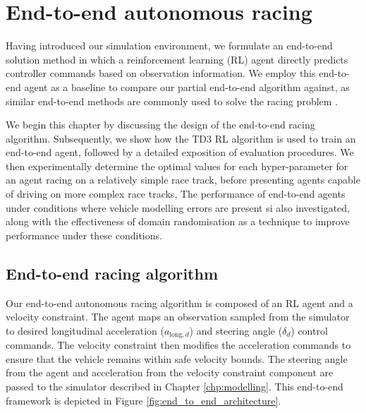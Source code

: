 \chapter{End-to-end autonomous racing}\label{chp:end_to_end_autonomous_racing}

Having introduced our simulation environment, 
we formulate an end-to-end solution method in which a reinforcement learning (RL) agent directly predicts controller commands based on observation information. 
We employ this end-to-end agent as a baseline to compare our partial end-to-end algorithm against, 
as similar end-to-end methods are commonly used to solve the racing problem \cite{Song2021, Fuchs2021, Ivanov2020, Perot2017, Jaritz2018, Schwarting2021, Niu2020, hsu2022, Chisari2021, brunnbauer2021, Remonda2021}. 

We begin this chapter by discussing the design of the end-to-end racing algorithm.
Subsequently, we show how the TD3 RL algorithm is used to train an end-to-end agent, followed by a detailed exposition of evaluation procedures. 
We then experimentally determine the optimal values for each hyper-parameter for an agent racing on a relatively simple race track, before presenting agents
capable of driving on more complex race tracks,
The performance of end-to-end agents under conditions where vehicle modelling errors are present si also investigated, along with the effectiveness of
domain randomisation as a technique to improve performance under these conditions.






\section{End-to-end racing algorithm}\label{sec:end-to-end_design}

Our end-to-end autonomous racing algorithm is composed of an RL agent and a velocity constraint.
The agent maps an observation sampled from the simulator to desired longitudinal acceleration ($a_{\text{long},d}$) and steering angle ($\delta_d$) control commands.
The velocity constraint then modifies the acceleration commands to ensure that the vehicle remains within safe velocity bounds.
The steering angle from the agent and acceleration from the velocity constraint component are passed to the simulator described in Chapter \ref{chp:modelling}.
This end-to-end framework is depicted in Figure \ref{fig:end_to_end_architecture}. 

